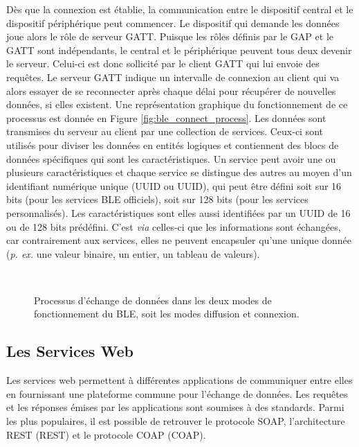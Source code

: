 Dès que la connexion est établie, la communication entre le dispositif central et le dispositif périphérique peut commencer. Le dispositif qui demande les données joue alors le rôle de serveur \acs{GATT}. Puisque les rôles définis par le \acs{GAP} et le \acs{GATT} sont indépendants, le central et le périphérique peuvent tous deux devenir le serveur. Celui-ci est donc sollicité par le client \acs{GATT} qui lui envoie des requêtes. Le serveur \acs{GATT} indique un intervalle de connexion au client qui va alors essayer de se reconnecter après chaque délai pour récupérer de nouvelles données, si elles existent. Une représentation graphique du fonctionnement de ce processus est donnée en Figure \ref{fig:ble_connect_process}. Les données sont transmises du serveur au client par une collection de services. Ceux-ci sont utilisés pour diviser les données en entités logiques et contiennent des blocs de données spécifiques qui sont les caractéristiques. Un service peut avoir une ou plusieurs caractéristiques et chaque service se distingue des autres au moyen d'un identifiant numérique unique (\acl{UUID} ou \acs{UUID}), qui peut être défini soit sur 16 bits (pour les services BLE officiels), soit sur 128 bits (pour les services personnalisés). Les caractéristiques sont elles aussi identifiées par un \acs{UUID} de 16 ou de 128 bits prédéfini. C'est \textit{via} celles-ci que les informations sont échangées, car contrairement aux services, elles ne peuvent encapsuler qu'une unique donnée (\textit{p. ex.} une valeur binaire, un entier, un tableau de valeurs).

\begin{figure}[H]
	\centering
    \\[10pt]
	\caption{Processus d'échange de données dans les deux modes de fonctionnement du \acs{BLE}, soit les modes diffusion et connexion.}
\end{figure}

\subsection{Les Services Web}
\label{sec:services_web}

Les services web permettent à différentes applications de communiquer entre elles en fournissant une plateforme commune pour l'échange de données. Les requêtes et les réponses émises par les applications sont soumises à des standards. Parmi les plus populaires, il est possible de retrouver le protocole \ac{SOAP}, l'architecture \acl{REST} (\acs{REST}) et le protocole \acl{COAP} (\acs{COAP}).


